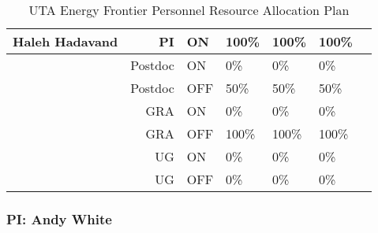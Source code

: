 \begin{table}[htb]
\begin{tabular}{ || r || r |  p{1.7cm} | p{1.7cm} | p{1.7cm} || p{1.7cm} | p{1.8cm} || }
\textbf{Haleh Hadavand}& PI & ON & 100\% & 100\% & 100\% \\ \hline
                                   & Postdoc & ON & 0\% & 0\% & 0\% \\ \hline
                                   & Postdoc & OFF & 50\% & 50\% & 50\% \\ \hline
                                   & GRA & ON & 0\% & 0\% & 0\% \\ \hline
                                   & GRA & OFF & 100\% & 100\% & 100\% \\ \hline
                                   & UG & ON & 0\% & 0\% & 0\% \\ \hline
                                   & UG & OFF & 0\% & 0\% & 0\% \\ \hline\hline\hline
\end{tabular}
\caption{UTA Energy Frontier Personnel Resource Allocation Plan}
\end{table}

\subsubsection{\bf PI: Andy White}

